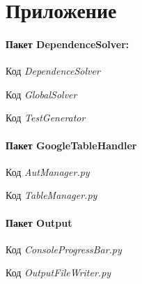 \newpage
\section*{Приложение}

\paragraph{Пакет DependenceSolver:\\
}
Код \textit{DependenceSolver}


Код \textit{GlobalSolver}


Код \textit{TestGenerator}


    
\newpage
\paragraph{Пакет GoogleTableHandler\\
}
Код \textit{AutManager.py}


Код \textit{TableManager.py}



\newpage
\paragraph{Пакет Output\\
}
Код \textit{ConsoleProgressBar.py}


Код \textit{OutputFileWriter.py}
